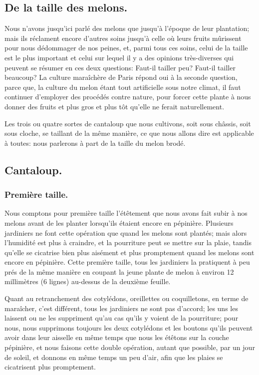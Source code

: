 \documentclass[10pt,a4paper]{book}
\begin{document}
\subsection{De la taille des melons.}

Nous n'avons jusqu'ici parlé des melons que jusqu'à l'époque de leur plantation; mais ils réclament encore d'autres soins jusqu'à celle où leurs fruits mûrissent pour nous dédommager de nos peines, et, parmi tous ces soins, celui de la taille est le plus important et celui sur lequel il y a des opinions très-diverses qui peuvent se résumer en ces deux questions: Faut-il tailler peu? Faut-il tailler beaucoup? La culture maraîchère de Paris répond oui à la seconde question, parce que, la culture du melon étant tout artificielle sous notre climat, il faut continuer d'employer des procédés contre nature, pour forcer cette plante à nous donner des fruits et plus gros et plus tôt qu'elle ne ferait naturellement.

Les trois ou quatre sortes de cantaloup que nous cultivons, soit sous châssis, soit sous cloche, se taillant de la même manière, ce que nous allons dire est applicable à toutes: nous parlerons à part de la taille du melon brodé.

\subsection{Cantaloup.}

\subsubsection{Première taille.}

Nous comptons pour première taille l'étêtement que nous avons fait subir à nos melons avant de les planter lorsqu'ils étaient encore en pépinière. Plusieurs jardiniers ne font cette opération que quand les melons sont plantés; mais alors l'humidité est plus à craindre, et la pourriture peut se mettre sur la plaie, tandis qu'elle se cicatrise bien plus aisément et plus promptement quand les melons sont encore en pépinière. Cette première taille, tous les jardiniers la pratiquent à peu prés de la même manière en coupant la jeune plante de melon à environ 12 millimètres (6 lignes) au-dessus de la deuxième feuille.

Quant au retranchement des cotylédons\label{retranchementcotyledons}, oreillettes ou coquilletons, en terme de maraîcher, c'est différent, tous les jardiniers ne sont pas d'accord; les uns les laissent ou ne les suppriment qu'au cas qu'ils y voient de la pourriture; pour nous, nous supprimons toujours les deux cotylédons et les boutons qu'ils peuvent avoir dans leur aisselle en même temps que nous les étêtons sur la couche pépinière, et nous faisons cette double opération, autant que possible, par un jour de soleil, et donnons en même temps un peu d'air, afin que les plaies se cicatrisent plus promptement.
\end{document}
